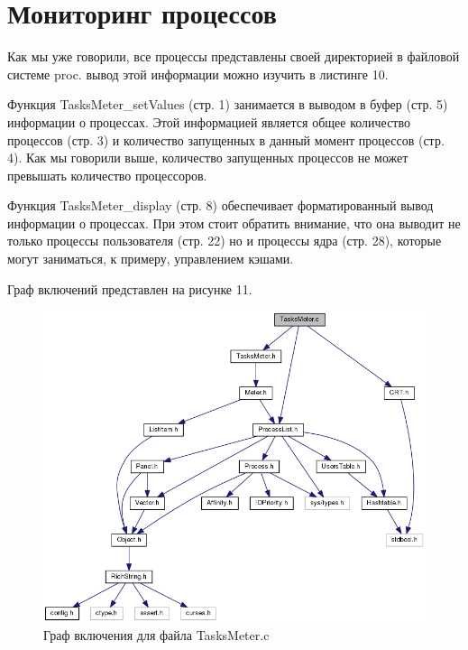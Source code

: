 \documentclass[a4paper, 12pt]{article}		%
\begin{document}
\newpage
\section{Мониторинг процессов}

Как мы уже говорили, все процессы представлены своей директорией в файловой системе proc. вывод этой информации можно изучить в листинге 10.

Функция TasksMeter\_setValues (стр. 1) занимается в выводом в буфер (стр. 5) информации о процессах. Этой информацией является общее количество процессов (стр. 3) и количество запущенных в данный момент процессов (стр. 4). Как мы говорили выше, количество запущенных процессов не может превышать количество процессоров.

Функция TasksMeter\_display (стр. 8) обеспечивает форматированный вывод информации о процессах. При этом стоит обратить внимание, что она выводит не только процессы пользователя (стр. 22) но и процессы ядра (стр. 28), которые могут заниматься, к примеру, управлением кэшами.

Граф включений представлен на рисунке 11.



\begin{figure}[h!]
\centering
\includegraphics[scale=0.6]{res/tasks_meter.png}
\caption{Граф включения для файла TasksMeter.c}
\end{figure}
\end{document}
